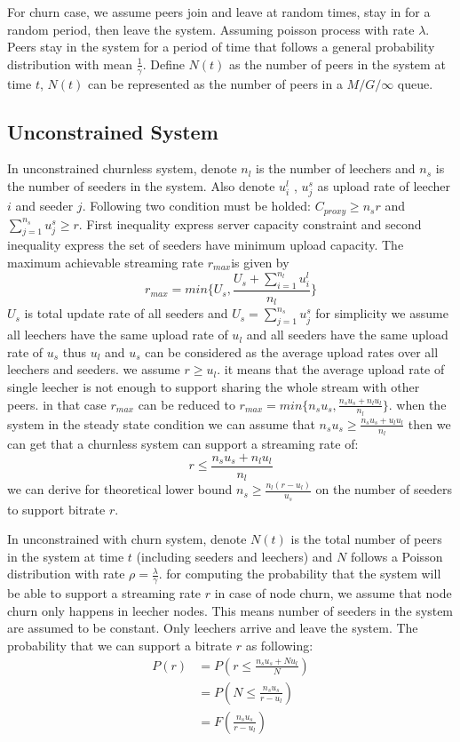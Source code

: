 \documentclass[paper]{ieice}
\begin{document}
For churn case, we assume peers join and leave at random times, stay in for a random period, then leave the system.
Assuming poisson process with rate $\lambda$.
Peers stay in the system for a period of time that follows a general probability distribution with mean $\frac{1}{\gamma}$.
Define $N(t)$ as the number of peers in the system at time $t$, $N(t)$ can be represented as the number of peers in a $M/G/\infty$ queue.

\subsection{Unconstrained System}
In unconstrained churnless system, denote $n_l$ is the number of leechers and $n_s$ is the number of seeders in the system.
Also denote $u_{i}^{l}$ , $u_{j}^{s}$ as upload rate of leecher $i$ and seeder $j$.
Following two condition must be holded: $C_{proxy}\ge n_s r$ and $\sum_{j=1}^{n_s} u_{j}^{s} \ge r$.
First inequality express server capacity constraint and second inequality express the set of seeders have minimum upload capacity.
The maximum achievable streaming rate $r_{max}$is given by
\begin{equation}
	r_{max} = min \{ {{U_s},\frac{U_s + \sum_{i=1}^{n_l} u_{i}^{l}}{n_l}} \}
\end{equation}
$U_s$ is total update rate of all seeders and $U_s=\sum_{j=1}^{n_s}u_{j}^{s}$
for simplicity we assume all leechers have the same upload rate of $u_l$ and all seeders have the same upload rate of $u_s$ thus $u_l$ and $u_s$ can be considered as the average upload rates over all leechers and seeders.  
we assume $r \ge u_l$. it means that the average upload rate of single leecher is not enough to support sharing the whole stream with other peers.
in that case $r_{max}$ can be reduced to $r_{max}=min\{n_s u_s,\frac{n_s u_s + n_l u_l}{n_l}\}$. 
when the system in the steady state condition we can assume that $n_s u_s \ge \frac{n_s u_s + u_l u_l }{n_l}$ then we can get that a churnless system can support 
a streaming rate of:
\begin{equation}
	r \le \frac{n_s u_s + n_l u_l}{n_l}
\end{equation}
we can derive for theoretical lower bound $n_s \ge \frac{n_l(r-u_l)}{u_s}$ on the number of seeders to support bitrate $r$.

In unconstrained with churn system, denote $N(t)$ is the total number of peers in the system at time $t$ (including seeders and leechers) and $N$ follows a Poisson distribution with rate $\rho = \frac{\lambda}{\gamma}$.
for computing the probability that the system will be able to support a streaming rate $r$ in case of node churn, we assume that node churn only happens in leecher nodes. This means number of seeders in the system are assumed to be constant. Only leechers arrive and leave the system.
The probability that we can support a bitrate $r$ as following:
\begin{align*}
  P(r) &= P(r \le \frac{n_s u_s + N u_l}{N}) \\
  &=P(N \le \frac{n_s u_s}{r - u_l}) \\
  &=F(\frac{n_s u_s}{r - u_l})
\end{align*}
\end{document}

